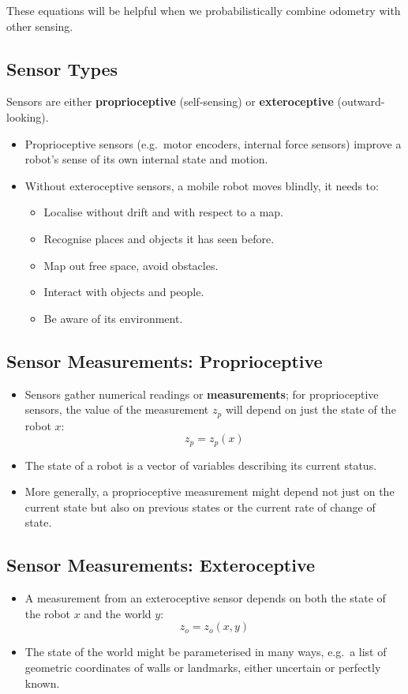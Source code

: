 \documentclass[11pt]{article}
\begin{document}
These equations will be helpful when we probabilistically combine odometry with other sensing.

\subsection{Sensor Types}
Sensors are either \textbf{proprioceptive} (self-sensing) or \textbf{exteroceptive} (outward-looking).
\begin{itemize}
  \item Proprioceptive sensors (e.g.\ motor encoders, internal force sensors) improve a robot's sense of its own internal state and motion.
  \item Without exteroceptive sensors, a mobile robot moves blindly, it needs to:
    \begin{itemize}
      \item Localise without drift and with respect to a map.
      \item Recognise places and objects it has seen before.
      \item Map out free space, avoid obstacles.
      \item Interact with objects and people.
      \item Be aware of its environment.
    \end{itemize}
\end{itemize}

\subsection{Sensor Measurements: Proprioceptive}
\begin{itemize}
  \item Sensors gather numerical readings or \textbf{measurements}; for proprioceptive sensors, the value of the measurement $z_p$ will depend on just the state of the robot $x$:
    \[
      z_p = z_p(x)
    \]
  \item The state of a robot is a vector of variables describing its current status.
  \item More generally, a proprioceptive measurement might depend not just on the current state but also on previous states or the current rate of change of state.
\end{itemize}

\subsection{Sensor Measurements: Exteroceptive}
\begin{itemize}
  \item A measurement from an exteroceptive sensor depends on both the state of the robot $x$ and the world $y$:
    \[
      z_o = z_o(x, y)
    \]
  \item The state of the world might be parameterised in many ways, e.g.\ a list of geometric coordinates of walls or landmarks, either uncertain or perfectly known.
\end{itemize}
\end{document}
